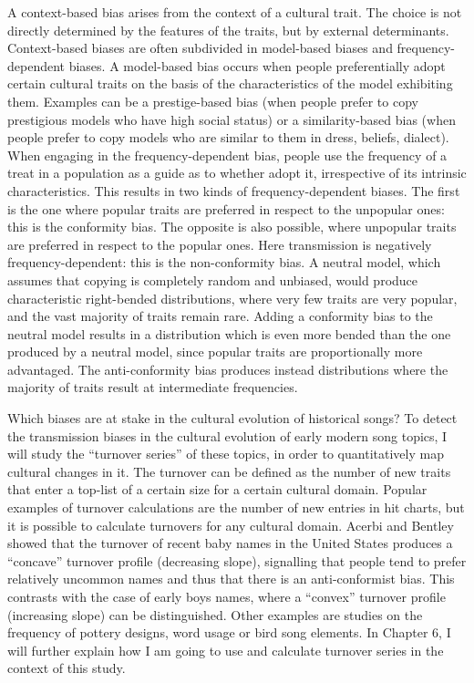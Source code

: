 A context-based bias arises from the context of a cultural trait. The choice is not directly determined by the features of the traits, but by external determinants. Context-based biases are often subdivided in model-based biases and frequency-dependent biases. A model-based bias occurs when people preferentially adopt certain cultural traits on the basis of the characteristics of the model exhibiting them. Examples can be a prestige-based bias (when people prefer to copy prestigious models who have high social status) or a similarity-based bias (when people prefer to copy models who are similar to them in dress, beliefs, dialect).\autocites[73]{mesoudi_cultural_2011}[129]{henrich_evolution_2003} When engaging in the frequency-dependent bias, people use the frequency of a treat in a population as a guide as to whether adopt it, irrespective of its intrinsic characteristics.\autocite[71]{mesoudi_cultural_2011} This results in two kinds of frequency-dependent biases. The first is the one where popular traits are preferred in respect to the unpopular ones: this is the conformity bias. The opposite is also possible, where unpopular traits are preferred in respect to the popular ones. Here transmission is negatively frequency-dependent: this is the non-conformity bias.\autocite[229]{acerbi_biases_2014} A neutral model, which assumes that copying is completely random and unbiased, would produce characteristic right-bended distributions, where very few traits are very popular, and the vast majority of traits remain rare. Adding a conformity bias to the neutral model results in a distribution which is even more bended than the one produced by a neutral model, since popular traits are proportionally more advantaged. The anti-conformity bias produces instead distributions where the majority of traits result at intermediate frequencies.\autocite[229]{acerbi_biases_2014}

Which biases are at stake in the cultural evolution of historical songs? To detect the transmission biases in the cultural evolution of early modern song topics, I will study the \enquote{turnover series} of these topics, in order to quantitatively map cultural changes in it. The turnover can be defined as the number of new traits that enter a top-list of a certain size for a certain cultural domain. Popular examples of turnover calculations are the number of new entries in hit charts, but it is possible to calculate turnovers for any cultural domain. Acerbi and Bentley showed that the turnover of recent baby names in the United States produces a \enquote{concave} turnover profile (decreasing slope), signalling that people tend to prefer relatively uncommon names and thus that there is an anti-conformist bias. This contrasts with the case of early boys names, where a \enquote{convex} turnover profile (increasing slope) can be distinguished.\autocite{acerbi_biases_2014} Other examples are studies on the frequency of pottery designs, word usage or bird song elements.\autocites{bentley_random_2004,bentley_random_2008,byers_independent_2010}[as cited in][229]{acerbi_biases_2014} In Chapter 6, I will further explain how I am going to use and calculate turnover series in the context of this study.